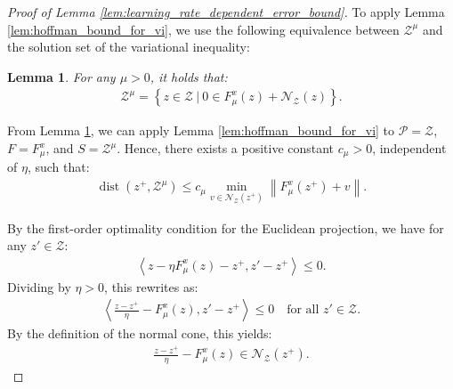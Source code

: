 \documentclass{article}
\DeclareMathOperator{\dist}{dist}
\newcommand{\Z}{\mathcal{Z}}
\theoremstyle{plain}
\newtheorem{lemma}[theorem]{Lemma}
\begin{document}
\begin{proof}[Proof of Lemma \ref{lem:learning_rate_dependent_error_bound}]
    To apply Lemma \ref{lem:hoffman_bound_for_vi}, we use the following equivalence between $\Z^{\mu}$ and the solution set of the variational inequality:
    \begin{lemma}
        For any $\mu > 0$, it holds that:
        \begin{align*}
            \Z^{\mu} = \left\{z\in \Z ~|~ 0\in F_{\mu}^x(z) + \mathcal{N}_{\Z}(z)\right\}.
        \end{align*}
        \label{lem:equivalence_of_vi_solution_and_regularized_equilibrium}
    \end{lemma}

    From Lemma \ref{lem:equivalence_of_vi_solution_and_regularized_equilibrium}, we can apply Lemma \ref{lem:hoffman_bound_for_vi} to $\mathcal{P} = \Z$, $F = F_{\mu}^x$, and $S = \Z^{\mu}$.
    Hence, there exists a positive constant $c_{\mu} > 0$, independent of $\eta$, such that:
    \begin{align}
        \dist(z^+, \Z^{\mu}) \leq c_{\mu} \min_{v\in \mathcal{N}_{\Z}(z^+)}\left\|F_{\mu}^x(z^+) + v\right\|.
        \label{eq:vi_hoffman_at_z_plus}
    \end{align}

    By the first-order optimality condition for the Euclidean projection, we have for any $z'\in \Z$:
    \begin{align*}
        \left\langle z - \eta F_{\mu}^x(z) - z^+, z' - z^+\right\rangle \leq 0.
    \end{align*}
    Dividing by $\eta > 0$, this rewrites as:
    \begin{align*}
        \left\langle \frac{z - z^+}{\eta} - F_{\mu}^x(z), z' - z^+\right\rangle \leq 0 \quad \text{for all } z'\in \Z.
    \end{align*}
    By the definition of the normal cone, this yields:
    \begin{align}
        \frac{z - z^+}{\eta} - F_{\mu}^x(z) \in \mathcal{N}_{\Z}(z^+).
        \label{eq:projection_normal_cone_inclusion}
    \end{align}


\end{proof}
\end{document}
